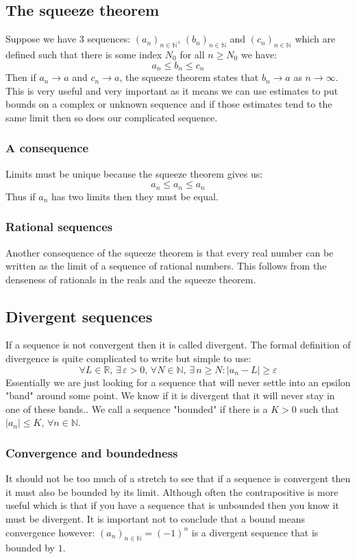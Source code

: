 \documentclass[12pt]{article}
\newcommand{\seq}[2]{(#1_#2)_{#2\in\mathbb{N}}}
\begin{document}
\subsection*{The squeeze theorem}
Suppose we have 3 sequences: \(\seq{a}{n},\,\seq{b}{n}\) and \(\seq{c}{n}\) which are defined such that there is some index \(N_0\) for all \(n\geq N_0\) we have:
\[a_n\leq b_n\leq c_n\]
Then if \(a_n\to a\) and \(c_n\to a\), the squeeze theorem states that \(b_n\to a\) as \(n\to\infty\). This is very useful and very important as it means we can use estimates to put bounds on a complex or unknown sequence and if those estimates tend to the same limit then so does our complicated sequence.
\subsubsection*{A consequence}
Limits must be unique because the squeeze theorem gives us:
\[a_n\leq a_n\leq a_n\]
Thus if \(a_n\) has two limits then they must be equal. 
\subsubsection*{Rational sequences}
Another consequence of the squeeze theorem is that every real number can be written as the limit of a sequence of rational numbers. This follows from the denseness of rationals in the reals and the squeeze theorem.
\subsection*{Divergent sequences}
If a sequence is not convergent then it is called divergent. The formal definition of divergence is quite complicated to write but simple to use:
\[\forall L\in\mathbb{R},\,\exists\,\varepsilon>0,\,\forall N\in\mathbb{N},\,\exists\,n\geq N:\vert a_n-L\vert\geq\varepsilon\]
Essentially we are just looking for a sequence that will never settle into an epsilon "band" around some point. We know if it is divergent that it will never stay in one of these bands.. We call a sequence "bounded" if there is a \(K>0\) such that \(\vert a_n\vert\leq K,\,\forall n\in\mathbb{N}\).
\subsubsection*{Convergence and boundedness}
It should not be too much of a stretch to see that if a sequence is convergent then it must also be bounded by its limit. Although often the contrapositive is more useful which is that if you have a sequence that is unbounded then you know it must be divergent. It is important not to conclude that a bound means convergence however: \(\seq{a}{n}=(-1)^n\) is a divergent sequence that is bounded by \(1\).
\end{document}
